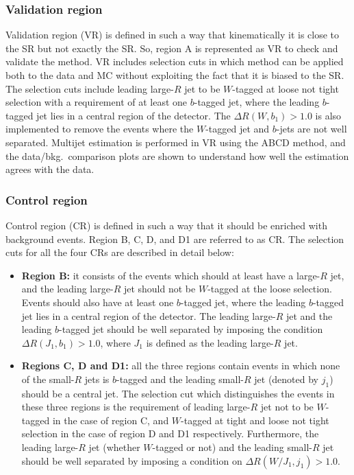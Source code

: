\subsubsection{Validation region}
\label{sec:abcd:implementation:regions:vr}
Validation region (VR) is defined in such a way that kinematically it is close to the SR but not exactly the SR. So, region A is represented as VR to check and validate the method. VR includes selection cuts in which method can be applied both to the data and MC without exploiting the fact that it is biased to the SR. The selection cuts include leading large-$R$ jet to be $W$-tagged at loose not tight selection with a requirement of at least one $b$-tagged jet, where the leading $b$-tagged jet lies in a central region of the detector. The $\Delta R(W,b_{\text{1}}) > 1.0$ is also implemented to remove the events where the $W$-tagged jet and $b$-jets are not well separated. Multijet estimation is performed in VR using the ABCD method, and the data/bkg.\ comparison plots are shown to understand how well the estimation agrees with the data.

\subsubsection{Control region}
\label{sec:abcd:implementation:regions:cr}
Control region (CR) is defined in such a way that it should be enriched with background events. Region B, C, D, and D1 are referred to as CR. The selection cuts for all the four CRs are described in detail below:

\begin{itemize}
	\item \textbf{Region B:} it consists of the events which should at least have a large-$R$ jet, and the leading large-$R$ jet should not be $W$-tagged at the loose selection. Events should also have at least one $b$-tagged jet, where the leading $b$-tagged jet lies in a central region of the detector. The leading large-$R$ jet and the leading $b$-tagged jet should be well separated by imposing the condition $\Delta R(J_{\text{1}},b_{\text{1}}) > 1.0$, where $J_{\text{1}}$ is defined as the leading large-$R$ jet.
	
	\item \textbf{Regions C, D and D1:} all the three regions contain events in which none of the small-$R$ jets is $b$-tagged and the leading small-$R$ jet (denoted by $j_{\text{1}}$) should be a central jet. The selection cut which distinguishes the events in these three regions is the requirement of leading large-$R$ jet not to be $W$-tagged in the case of region C, and $W$-tagged at tight and loose not tight selection in the case of region D and D1 respectively. Furthermore, the leading large-$R$ jet (whether $W$-tagged or not) and the leading small-$R$ jet should be well separated by imposing a condition on $\Delta R(W/J_{\text{1}},j_{\text{1}}) > 1.0$.
\end{itemize}

